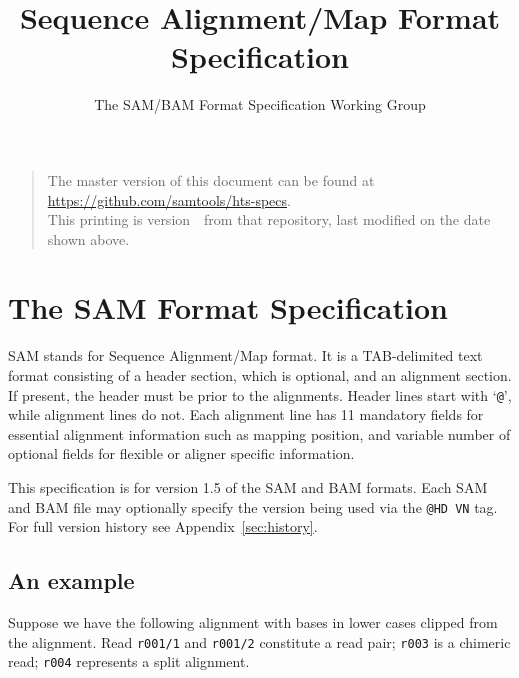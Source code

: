 \documentclass[10pt]{article}
\begin{document}

\title{Sequence Alignment/Map Format Specification}
\author{The SAM/BAM Format Specification Working Group}
\date{\headdate}
\maketitle
\begin{quote}\small
The master version of this document can be found at
\url{https://github.com/samtools/hts-specs}.\\
This printing is version~\commitdesc\ from that repository,
last modified on the date shown above.
\end{quote}
\vspace*{1em}


\section{The SAM Format Specification}
SAM stands for Sequence Alignment/Map format. It is a TAB-delimited text
format consisting of a header section, which is optional, and an
alignment section. If present, the header must be prior to the
alignments. Header lines start with `{\tt @}', while alignment lines do
not. Each alignment line has 11 mandatory fields for essential alignment
information such as mapping position, and variable number of optional
fields for flexible or aligner specific information.

This specification is for version 1.5 of the SAM and BAM formats.  Each SAM and
BAM file may optionally specify the version being used via the
{\tt @HD VN} tag. For full version history see Appendix~\ref{sec:history}.

\subsection{An example}\label{sec:example}
Suppose we have the following alignment with bases in lower cases
clipped from the alignment. Read {\tt r001/1} and {\tt r001/2}
constitute a read pair; {\tt r003} is a chimeric read; {\tt r004}
represents a split alignment.
\end{document}
